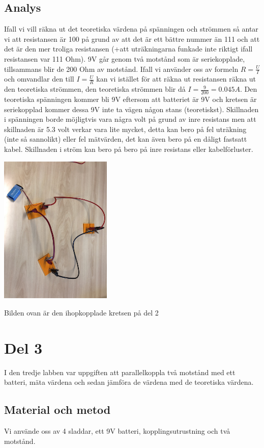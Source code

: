 \documentclass[11p]{article}
\begin{document}
    \subsection{Analys}
    Ifall vi vill räkna ut det teoretiska värdena på spänningen och strömmen så antar vi att resistansen är 100 på grund av att det är ett bättre nummer än 111 och att det är den mer troliga resistansen (+att uträkningarna funkade inte riktigt ifall resistansen var 111 Ohm).
    9V går genom två motstånd som är seriekopplade, tillsammans blir de 200 Ohm av motstånd. Ifall vi använder oss av formeln $ R=\frac{U}{I}$
    och omvandlar den till $ I=\frac{U}{R}$ kan vi istället för att räkna ut resistansen räkna ut den teoretiska strömmen,
    den teoretiska strömmen blir då $ I=\frac{9}{200}=0.045 A $. Den teoretiska spänningen kommer bli 9V eftersom att batteriet är 9V
    och kretsen är seriekopplad kommer dessa 9V inte ta vägen någon stans (teoretiskst). Skillnaden i spänningen borde
    möjligtvis vara några volt på grund av inre resistans men att skillnaden är 5.3 volt verkar vara lite mycket, detta kan bero på fel uträkning (inte så sannolikt) eller fel
    mätvärden, det kan även bero på en dåligt fastsatt kabel. Skillnaden i ström kan bero på bero på inre resistans eller kabelförluster.

    \includegraphics[width=0.4\textwidth]{../images/LabbDel2.jpg}

    Bilden ovan är den ihopkopplade kretsen på del 2
    \section{Del 3}
    I den tredje labben var uppgiften att parallelkoppla två motstånd med ett batteri, mäta värdena och sedan jämföra de värdena med de teoretiska värdena.
    \subsection{Material och metod}
    Vi använde oss av 4 sladdar, ett 9V batteri, kopplingsutrustning och två motstånd.
\end{document}
